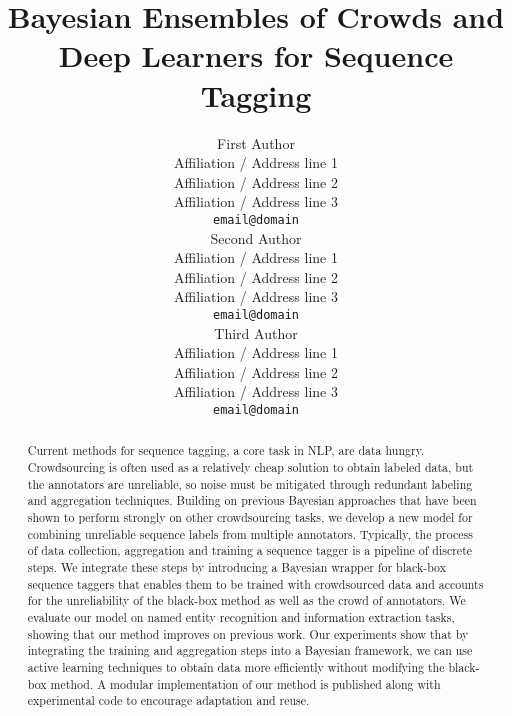 \documentclass[11pt,a4paper]{article}
\title{Bayesian Ensembles of Crowds and Deep Learners for Sequence Tagging}%
\author{First Author \\
  Affiliation / Address line 1 \\
  Affiliation / Address line 2 \\
  Affiliation / Address line 3 \\
  {\tt email@domain} \\\And
  Second Author \\
  Affiliation / Address line 1 \\
  Affiliation / Address line 2 \\
  Affiliation / Address line 3 \\
  {\tt email@domain} \\\And
  Third Author \\
  Affiliation / Address line 1 \\
  Affiliation / Address line 2 \\
  Affiliation / Address line 3 \\
  {\tt email@domain} \\
}
\begin{document}
\maketitle


\begin{abstract}
Current methods for sequence tagging, a core task in NLP, are data hungry.
Crowdsourcing is often used as a relatively cheap solution to obtain labeled data, but
the annotators are unreliable, so noise must be mitigated through redundant labeling
and aggregation techniques.
Building on previous Bayesian approaches that have been shown to perform strongly 
on other crowdsourcing tasks,
we develop a new model for combining unreliable sequence labels from multiple annotators.
Typically, the process of data collection, aggregation and training a sequence tagger 
is a pipeline of discrete steps.
We integrate these steps by introducing
a Bayesian wrapper for black-box sequence taggers that enables them to be trained with
crowdsourced data and accounts for the unreliability of the black-box method as well as the crowd of annotators.
We evaluate our model on named entity recognition and information extraction tasks,
showing that our method improves on previous work. 
Our experiments show that by integrating the training and aggregation steps into a Bayesian framework, 
we can use active learning techniques to obtain data more efficiently without modifying the black-box method.
A modular implementation of our method is published along with experimental code to encourage adaptation and reuse.


\end{abstract}
\end{document}
